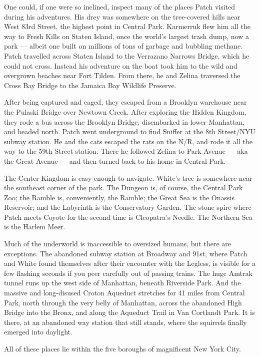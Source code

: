 \documentclass[ebook,oneside,openany,17pt]{memoir}
\begin{document}
One could, if one were so inclined, inspect many of the places Patch
visited during his adventures. His drey was somewhere on the
tree-covered hills near West 83rd Street, the highest point in Central
Park. Karmerruk flew him all the way to Fresh Kills on Staten Island,
once the world’s largest trash dump, now a park — albeit one built on
millions of tons of garbage and bubbling methane. Patch travelled
across Staten Island to the Verrazano Narrows Bridge, which he could
not cross. Instead his adventure on the boat took him to the wild and
overgrown beaches near Fort Tilden. From there, he and Zelina
traversed the Cross Bay Bridge to the Jamaica Bay Wildlife Preserve.

After being captured and caged, they escaped from a Brooklyn warehouse
near the Pulaski Bridge over Newtown Creek. After exploring the Hidden
Kingdom, they rode a bus across the Brooklyn Bridge, disembarked in
lower Manhattan, and headed north. Patch went underground to find
Sniffer at the 8th Street/NYU subway station. He and the cats escaped
the rats on the N/R, and rode it all the way to the 59th Street
station. There he followed Zelina to Park Avenue — aka the Great
Avenue — and then turned back to his home in Central Park.

The Center Kingdom is easy enough to navigate. White’s tree is
somewhere near the southeast corner of the park. The Dungeon is, of
course, the Central Park Zoo; the Ramble is, conveniently, the Ramble;
the Great Sea is the Onassis Reservoir; and the Labyrinth is the
Conservatory Garden. The stone spire where Patch meets Coyote for the
second time is Cleopatra’s Needle. The Northern Sea is the Harlem
Meer.

Much of the underworld is inaccessible to oversized humans, but there
are exceptions. The abandoned subway station at Broadway and
91st, where Patch and White found themselves after their
encounter with the Legless, is visible for a few flashing seconds if
you peer carefully out of passing trains. The huge Amtrak tunnel runs
up the west side of Manhattan, beneath Riverside Park. And the massive
and long-disused Croton Aqueduct stretches for 41 miles from Central
Park, north through the very belly of Manhattan, across the abandoned
High Bridge into the Bronx, and along the Aqueduct Trail in Van
Cortlandt Park. It is there, at an abandoned way station that still
stands, where the squirrels finally emerged into daylight.

All of these places lie within the five boroughs of magnificent New
York City.

\end{document}
